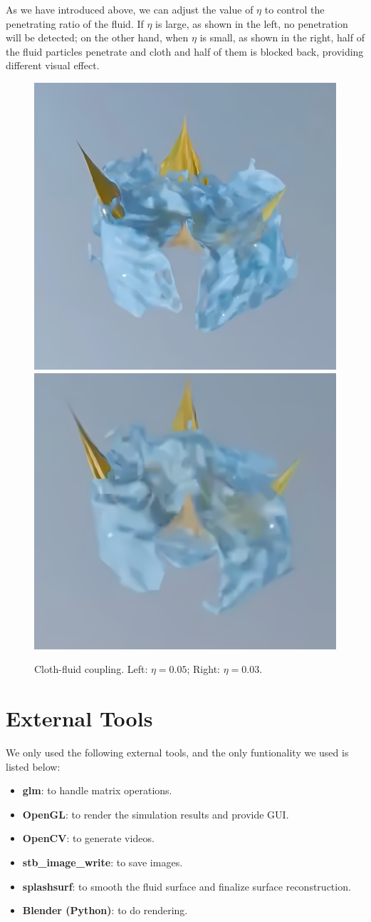 As we have introduced above, we can adjust the value of $\eta$ to control the penetrating ratio of the fluid. If $\eta$ is large, as shown in the left, no penetration will be detected; on the other hand, when $\eta$ is small, as shown in the right, half of the fluid particles penetrate and cloth and half of them is blocked back, providing different visual effect.
\begin{figure}[h]
  \centering
  \includegraphics[width=0.4\linewidth]{../project_demos/coup1.png}
  \includegraphics[width=0.415\linewidth]{../project_demos/coup2.png}
  \caption{Cloth-fluid coupling. Left: $\eta=0.05$; Right: $\eta=0.03$.}
  \label{fig-coup}
\end{figure}

\section{External Tools}

We only used the following external tools, and the only funtionality we used is listed below:

\begin{itemize}
\item \textbf{glm}: to handle matrix operations.
\item \textbf{OpenGL}: to render the simulation results and provide GUI.
\item \textbf{OpenCV}: to generate videos.
\item \textbf{stb\_image\_write}: to save images.
\item \textbf{splashsurf}: to smooth the fluid surface and finalize surface reconstruction.
\item \textbf{Blender (Python)}: to do rendering.
\end{itemize}

